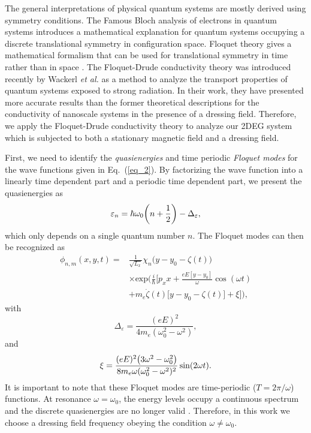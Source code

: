 
The general interpretations of physical quantum systems are mostly derived using symmetry conditions. The Famous Bloch analysis of electrons in quantum systems introduces a mathematical explanation for quantum systems occupying a discrete translational symmetry in configuration space. Floquet theory gives a mathematical formalism that can be used for translational symmetry in time rather than in space \cite{floquet83,grifoni98,holthaus15}.
The Floquet-Drude conductivity theory was introduced recently by Wackerl \textit{et al.} \cite{wackerl20} as a method to analyze the transport properties of quantum systems exposed to strong radiation.
In their work, they have presented more accurate results than the former theoretical descriptions for the conductivity of nanoscale systems in the  presence of a dressing field. Therefore, we apply the Floquet-Drude conductivity theory to analyze our 2DEG system which is subjected to both a stationary magnetic field and a dressing field.

First, we need to identify the \textit{quasienergies} and time periodic \textit{Floquet modes} \cite{grifoni98} for the wave functions given in Eq.~(\ref{eq_2}). By factorizing the wave function into a linearly time dependent part and a periodic time dependent part, we present the quasienergies as
\begin{equation} \label{eq_6}
  \varepsilon_{n} =
  \hbar \omega_0\qty(n + \frac{1}{2}) - \Delta_{\varepsilon},
\end{equation}
which only depends on a single quantum number $n$. The Floquet modes can then be recognized as
\begin{equation} \label{eq_7}
  \begin{aligned}
    \phi_{n,m}(x,y,t) = &
    \frac{1}{\sqrt{L_x}} \chi_{n}\big(y - y_0 - \zeta(t)\big)\\
    & \times
    \text{exp}\bigg(
     \frac{i}{\hbar}\bigg[
     p_x x +
     \frac{eE[y - y_0]}{\omega}\cos(\omega t) \\
     & +
     m_e\dot{\zeta}(t)\big[y - y_0 -\zeta(t)\big]
     + \xi \bigg]\bigg),
  \end{aligned}
\end{equation}
with
\begin{equation} \label{eq_8a}
  \Delta_{\varepsilon} = \frac{(eE)^2}{4m_e(\omega_0^2 - \omega^2)},
\end{equation}
and
\begin{equation} \label{eq_8b}
  \xi = \frac{(eE)^2\qty(3\omega^2 - \omega_0^2)}{8m_e\omega(\omega_0^2 - \omega^2)^2} \sin(2\omega t).
\end{equation}
It is important to note that these Floquet modes are time-periodic ($T=2\pi/\omega$) functions. At resonance $\omega = \omega_0$, the energy levels occupy a continuous spectrum and the discrete quasienergies are no longer valid \cite{popov70}. Therefore, in this work we choose a dressing field frequency obeying the condition $\omega \neq \omega_0$.

